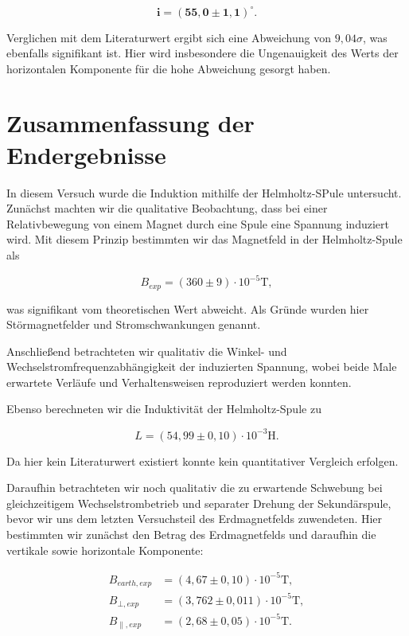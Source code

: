 \documentclass{article}
\begin{document}
\begin{equation}
    \bm{i = (55,0 \pm 1,1)^\circ}.
\end{equation}

Verglichen mit dem Literaturwert ergibt sich eine Abweichung von $9,04\sigma$, was ebenfalls signifikant ist. Hier wird insbesondere die Ungenauigkeit des Werts der horizontalen Komponente für die hohe Abweichung gesorgt haben. 


\clearpage
\newpage
\section{Zusammenfassung der Endergebnisse}

In diesem Versuch wurde die Induktion mithilfe der Helmholtz-SPule untersucht. Zunächst machten wir die qualitative Beobachtung, dass bei einer Relativbewegung von einem Magnet durch eine Spule eine Spannung induziert wird. Mit diesem Prinzip bestimmten wir das Magnetfeld in der Helmholtz-Spule als

\begin{equation}
    B_{exp} = (360 \pm 9)\cdot 10^{-5} \text{T},
\end{equation}

was signifikant vom theoretischen Wert abweicht. Als Gründe wurden hier Störmagnetfelder und Stromschwankungen genannt. 

Anschließend betrachteten wir qualitativ die Winkel- und Wechselstromfrequenzabhängigkeit der induzierten Spannung, wobei beide Male erwartete Verläufe und Verhaltensweisen reproduziert werden konnten.

Ebenso berechneten wir die Induktivität der Helmholtz-Spule zu 

\begin{equation}
    L = (54,99 \pm 0,10)\cdot 10^{-3} \text{H}.
\end{equation}

Da hier kein Literaturwert existiert konnte kein quantitativer Vergleich erfolgen. 

Daraufhin betrachteten wir noch qualitativ die zu erwartende Schwebung bei gleichzeitigem Wechselstrombetrieb und separater Drehung der Sekundärspule, bevor wir uns dem letzten Versuchsteil des Erdmagnetfelds zuwendeten. Hier bestimmten wir zunächst den Betrag des Erdmagnetfelds und daraufhin die vertikale sowie horizontale Komponente:

\begin{equation}
    \begin{split}
        B_{earth,exp} &= (4,67 \pm 0,10)\cdot 10^{-5} \text{T}, \\
        B_{\bot,exp} &= (3,762 \pm 0,011)\cdot 10^{-5} \text{T}, \\
        B_{\parallel,exp} &= (2,68 \pm 0,05)\cdot 10^{-5} \text{T}.
    \end{split}
\end{equation}
\end{document}
